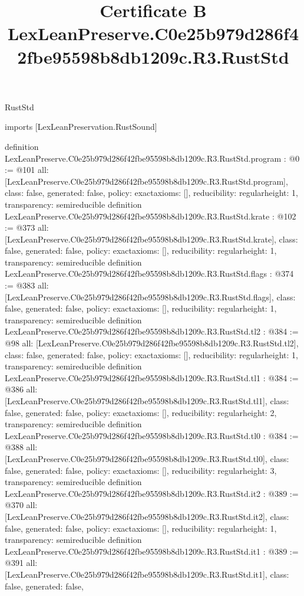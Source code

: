 \begin{lexlean}{RustStd}
\title{Certificate B LexLeanPreserve.C0e25b979d286f42fbe95598b8db1209c.R3.RustStd}
\begin{coremodule}
imports [LexLeanPreservation.RustSound]

definition LexLeanPreserve.C0e25b979d286f42fbe95598b8db1209c.R3.RustStd.program : @0 := @101 {
  all: [LexLeanPreserve.C0e25b979d286f42fbe95598b8db1209c.R3.RustStd.program],
  class: false,
  generated: false,
  policy: exact{axioms: []},
  reducibility: regular{height: 1},
  transparency: semireducible
}
definition LexLeanPreserve.C0e25b979d286f42fbe95598b8db1209c.R3.RustStd.krate : @102 := @373 {
  all: [LexLeanPreserve.C0e25b979d286f42fbe95598b8db1209c.R3.RustStd.krate],
  class: false,
  generated: false,
  policy: exact{axioms: []},
  reducibility: regular{height: 1},
  transparency: semireducible
}
definition LexLeanPreserve.C0e25b979d286f42fbe95598b8db1209c.R3.RustStd.flags : @374 := @383 {
  all: [LexLeanPreserve.C0e25b979d286f42fbe95598b8db1209c.R3.RustStd.flags],
  class: false,
  generated: false,
  policy: exact{axioms: []},
  reducibility: regular{height: 1},
  transparency: semireducible
}
definition LexLeanPreserve.C0e25b979d286f42fbe95598b8db1209c.R3.RustStd.tl2 : @384 := @98 {
  all: [LexLeanPreserve.C0e25b979d286f42fbe95598b8db1209c.R3.RustStd.tl2],
  class: false,
  generated: false,
  policy: exact{axioms: []},
  reducibility: regular{height: 1},
  transparency: semireducible
}
definition LexLeanPreserve.C0e25b979d286f42fbe95598b8db1209c.R3.RustStd.tl1 : @384 := @386 {
  all: [LexLeanPreserve.C0e25b979d286f42fbe95598b8db1209c.R3.RustStd.tl1],
  class: false,
  generated: false,
  policy: exact{axioms: []},
  reducibility: regular{height: 2},
  transparency: semireducible
}
definition LexLeanPreserve.C0e25b979d286f42fbe95598b8db1209c.R3.RustStd.tl0 : @384 := @388 {
  all: [LexLeanPreserve.C0e25b979d286f42fbe95598b8db1209c.R3.RustStd.tl0],
  class: false,
  generated: false,
  policy: exact{axioms: []},
  reducibility: regular{height: 3},
  transparency: semireducible
}
definition LexLeanPreserve.C0e25b979d286f42fbe95598b8db1209c.R3.RustStd.it2 : @389 := @370 {
  all: [LexLeanPreserve.C0e25b979d286f42fbe95598b8db1209c.R3.RustStd.it2],
  class: false,
  generated: false,
  policy: exact{axioms: []},
  reducibility: regular{height: 1},
  transparency: semireducible
}
definition LexLeanPreserve.C0e25b979d286f42fbe95598b8db1209c.R3.RustStd.it1 : @389 := @391 {
  all: [LexLeanPreserve.C0e25b979d286f42fbe95598b8db1209c.R3.RustStd.it1],
  class: false,
  generated: false,
}
\end{coremodule}
\end{lexlean}
